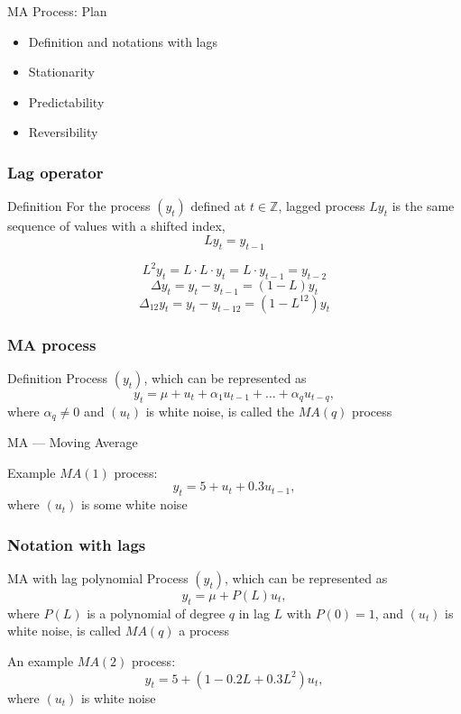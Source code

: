 
\begin{frame} %


\end{frame}



\begin{frame}{MA Process: Plan}
	\begin{itemize}[<+->]
		\item Definition and notations with lags
		\item Stationarity
		\item Predictability
		\item Reversibility
	\end{itemize}
	
\end{frame}

\begin{frame}
	\frametitle{Lag operator}
	
	\begin{block}{Definition}
		For the process $(y_t)$ defined at $t \in \mathbb{Z}$, \alert{lagged} process
		$L y_t$ is the same sequence of values ​​with a shifted index,
		\[
		L y_t = y_{t-1}
		\]
	\end{block}
	
	\pause
	\[
	L^2 y_t = L\cdot L\cdot y_t = L\cdot y_{t-1} = y_{t-2}
	\]
	\pause
	\[
	\Delta y_t = y_t - y_{t-1} = (1 - L) y_t
	\]
	\pause
	\[
	\Delta_{12} y_t = y_t - y_{t-12} = (1 - L^{12}) y_t
	\]
\end{frame}

\begin{frame}
	\frametitle{MA process}
	
	\begin{block}{Definition}
		Process $(y_t)$, which \alert{can} be represented as
		\[
		y_t = \mu + u_t + \alpha_1 u_{t-1} + \ldots + \alpha_q u_{t-q},
		\]
		where $\alpha_q \neq 0$ and $(u_t)$ is white noise, is called the $MA(q)$ process
	\end{block}

	\alert{MA — Moving Average}
	
	
	\pause
	Example $MA(1)$ process:
	\[
	y_t = 5 + u_t + 0.3 u_{t-1},
	\]
	where $(u_t)$ is some white noise

	
\end{frame}


\begin{frame}
	\frametitle{Notation with lags}
	
	\begin{block}{MA with lag polynomial}
		Process $(y_t)$, which \alert{can} be represented as
		\[
		y_t = \mu + P(L) u_t,
		\]
		where $P(L)$ is a polynomial of degree $q$ in lag $L$ with $P(0)=1$, and $(u_t)$ is white noise,
		is called $MA(q)$ a process
	\end{block}
	
	\pause
	An example $MA(2)$ process:
	\[
	y_t = 5 + (1 - 0.2 L + 0.3 L^2) u_t,
	\]
	where $(u_t)$ is white noise
\end{frame}





